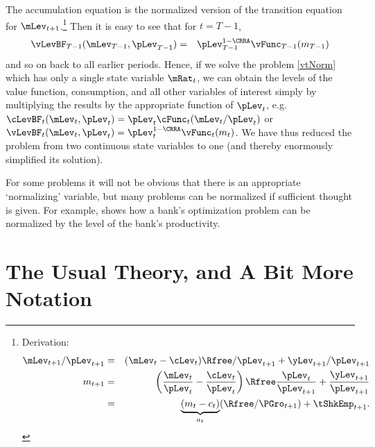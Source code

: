 \documentclass[titlepage]{\econtex}
\begin{document}
The accumulation equation is the normalized version of the transition
equation for $\mLev_{t+1}$.\footnote{Derivation:
  \begin{eqnarray*}
    \mLev_{t+1}/\pLev_{t+1} & = & (\mLev_{t}-\cLev_{t})\Rfree/\pLev_{t+1} + {\yLev}_{t+1}/\pLev_{t+1}
    \\      {m}_{t+1} & = & \left(\frac{\mLev_{t}}{\pLev_{t}} - \frac{\cLev_{t}}{\pLev_{t}}\right)\Rfree\frac{\pLev_{t}}{\pLev_{t+1}} + \frac{{\yLev}_{t+1}}{\pLev_{t+1}}
    \\       & = & \underbrace{({m}_{t} - {c}_{t})}_{{a}_{t}}(\Rfree/\PGro_{t+1}) + \tShkEmp_{t+1}.
  \end{eqnarray*}
}  Then it is easy to see that for $t=T-1$,
\begin{eqnarray*}
  \vLevBF_{T-1}(\mLev_{T-1},\pLev_{T-1}) &=& \pLev_{T-1}^{1-\CRRA}\null{\vFunc}_{T-1}({m}_{T-1})
\end{eqnarray*}
and so on back to all earlier periods.  Hence, if we solve the problem \eqref{vtNorm}
which has only a single state variable $\mRat_{t}$, we can obtain the levels of
the value function, consumption, and all other variables of interest
simply by multiplying the results by
the appropriate function of $\pLev_{t}$, e.g.\ $\cLevBF_{t}(\mLev_{t},\pLev_{t})=\pLev_{t}\cFunc_{t}(\mLev_{t}/\pLev_{t})$ or $\vLevBF_{t}({\mLev}_{t},\pLev_{t}) = \pLev_{t}^{1-\CRRA}\vFunc_{t}({m}_{t})$.  We have thus reduced the
problem from two continuous state variables to one (and thereby enormously simplified its solution).

For some problems it will not be obvious that there is an appropriate
`normalizing' variable, but many problems can be normalized if
sufficient thought is given.  For example, \cite{valencia:2006} shows
how a bank's optimization problem can be normalized by the level of
the bank's productivity.


\hypertarget{The-Usual-Theory}{}
\section{The Usual Theory, and A Bit More Notation}
\label{sec:usualtheory}
\end{document}
